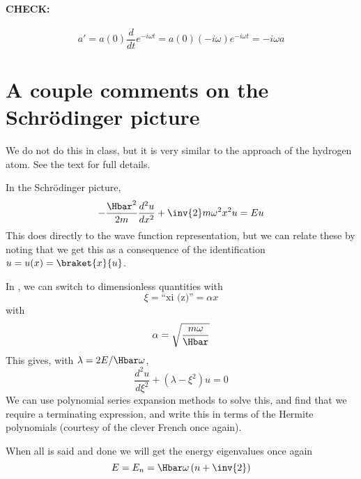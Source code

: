 \paragraph{CHECK:}
\begin{equation}\label{eqn:PHY356FLecture11:291}
a' = a(0) \frac{d}{dt} e^{-i \omega t} = a(0) (-i \omega) e^{-i \omega t} = -i \omega a
\end{equation}
%
\section{A couple comments on the Schr\"{o}dinger picture}

We do not do this in class, but it is very similar to the approach of the hydrogen atom.  See the text for full details.

In the Schr\"{o}dinger picture,
\begin{equation}\label{eqn:PHY356FLecture11:400}
-\frac{\Hbar^2}{2m} \frac{d^2 u}{dx^2} + \inv{2} m \omega^2 x^2 u = E u
\end{equation}
%
This does directly to the wave function representation, but we can relate these by noting that we get this as a consequence of the identification \(u = u(x) = \braket{x}{u}\).

In , we can switch to dimensionless quantities with
\begin{equation}\label{eqn:PHY356FLecture11:410}
\xi = \text{``xi (z)''} = \alpha x
\end{equation}
%
with
\begin{equation}\label{eqn:PHY356FLecture11:411}
\alpha = \sqrt{\frac{m \omega}{\Hbar}}
\end{equation}
%
This gives, with \(\lambda = 2E/\Hbar\omega\),
%
\begin{equation}\label{eqn:PHY356FLecture11:420}
\frac{d^2 u}{d\xi^2} + (\lambda - \xi^2) u = 0
\end{equation}
%
We can use polynomial series expansion methods to solve this, and find that we require a terminating expression, and write this in terms of the Hermite polynomials (courtesy of the clever French once again).

When all is said and done we will get the energy eigenvalues once again
\begin{equation}\label{eqn:PHY356FLecture11:430}
E = E_n = \Hbar \omega \left( n + \inv{2} \right)
\end{equation}
%
